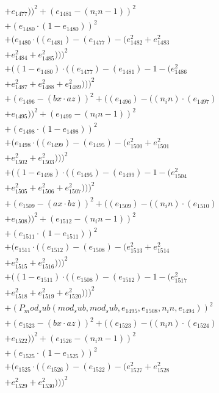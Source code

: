 \documentclass[10pt, a4paper]{article}
\begin{document}
\begin{align*}
& + e_{1477}))^{2} + (e_{1481} - (n_in - 1))^{2} \\
& + (e_{1480}  \cdot  (1 - e_{1480}))^{2} \\
& + (e_{1480}  \cdot  ((e_{1481}) - (e_{1477}) - (e_{1482}^{2} + e_{1483}^{2} \\
& + e_{1484}^{2} + e_{1485}^{2})))^{2} \\
& + ((1 - e_{1480})  \cdot  ((e_{1477}) - (e_{1481}) - 1 - (e_{1486}^{2} \\
& + e_{1487}^{2} + e_{1488}^{2} + e_{1489}^{2})))^{2} \\
& + (e_{1496} - (bx  \cdot  az))^{2} + ((e_{1496}) - ((n_in)  \cdot  (e_{1497}) \\
& + e_{1495}))^{2} + (e_{1499} - (n_in - 1))^{2} \\
& + (e_{1498}  \cdot  (1 - e_{1498}))^{2} \\
& + (e_{1498}  \cdot  ((e_{1499}) - (e_{1495}) - (e_{1500}^{2} + e_{1501}^{2} \\
& + e_{1502}^{2} + e_{1503}^{2})))^{2} \\
& + ((1 - e_{1498})  \cdot  ((e_{1495}) - (e_{1499}) - 1 - (e_{1504}^{2} \\
& + e_{1505}^{2} + e_{1506}^{2} + e_{1507}^{2})))^{2} \\
& + (e_{1509} - (ax  \cdot  bz))^{2} + ((e_{1509}) - ((n_in)  \cdot  (e_{1510}) \\
& + e_{1508}))^{2} + (e_{1512} - (n_in - 1))^{2} \\
& + (e_{1511}  \cdot  (1 - e_{1511}))^{2} \\
& + (e_{1511}  \cdot  ((e_{1512}) - (e_{1508}) - (e_{1513}^{2} + e_{1514}^{2} \\
& + e_{1515}^{2} + e_{1516}^{2})))^{2} \\
& + ((1 - e_{1511})  \cdot  ((e_{1508}) - (e_{1512}) - 1 - (e_{1517}^{2} \\
& + e_{1518}^{2} + e_{1519}^{2} + e_{1520}^{2})))^{2} \\
& + (P_mod_sub(mod_sub, mod_sub, e_{1495}, e_{1508}, n_in, e_{1494}))^{2} \\
& + (e_{1523} - (bx  \cdot  az))^{2} + ((e_{1523}) - ((n_in)  \cdot  (e_{1524}) \\
& + e_{1522}))^{2} + (e_{1526} - (n_in - 1))^{2} \\
& + (e_{1525}  \cdot  (1 - e_{1525}))^{2} \\
& + (e_{1525}  \cdot  ((e_{1526}) - (e_{1522}) - (e_{1527}^{2} + e_{1528}^{2} \\
& + e_{1529}^{2} + e_{1530}^{2})))^{2} \\

\end{align*}
\end{document}
